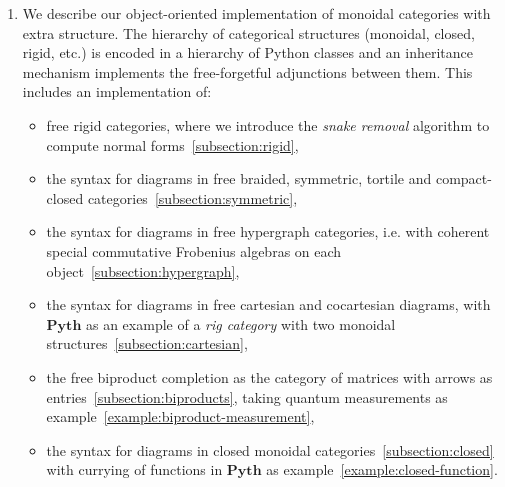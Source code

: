 \begin{enumerate}
\item We describe our object-oriented implementation of monoidal categories with extra structure.
The hierarchy of categorical structures (monoidal, closed, rigid, etc.) is encoded in a hierarchy of Python classes and an inheritance mechanism implements the free-forgetful adjunctions between them.
This includes an implementation of:
\begin{itemize}
\item free rigid categories, where we introduce the \emph{snake removal} algorithm to compute normal forms~\ref{subsection:rigid},
\item the syntax for diagrams in free braided, symmetric, tortile and compact-closed categories~\ref{subsection:symmetric},
\item the syntax for diagrams in free hypergraph categories, i.e. with coherent special commutative Frobenius algebras on each object~\ref{subsection:hypergraph},
\item the syntax for diagrams in free cartesian and cocartesian diagrams, with $\mathbf{Pyth}$ as an example of a \emph{rig category} with two monoidal structures~\ref{subsection:cartesian},
\item the free biproduct completion as the category of matrices with arrows as entries~\ref{subsection:biproducts}, taking quantum measurements as example~\ref{example:biproduct-measurement},
\item the syntax for diagrams in closed monoidal categories~\ref{subsection:closed} with currying of functions in $\mathbf{Pyth}$ as example~\ref{example:closed-function}.
\end{itemize}


\end{enumerate}
